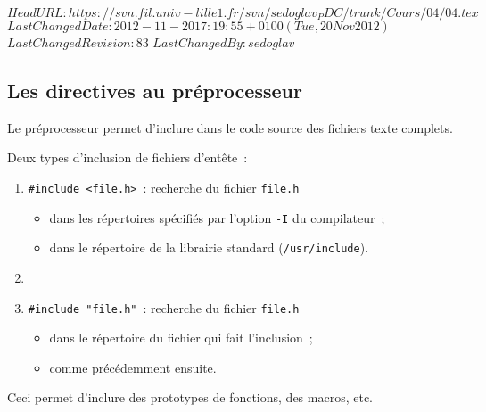 \svnidlong 
{$HeadURL: https://svn.fil.univ-lille1.fr/svn/sedoglav_PDC/trunk/Cours/04/04.tex $} 
{$LastChangedDate: 2012-11-20 17:19:55 +0100 (Tue, 20 Nov 2012) $} 
{$LastChangedRevision: 83 $} 
{$LastChangedBy: sedoglav $} 
\begin{frame}[fragile]
  \section{Les directives au pr\'eprocesseur}%
  Le pr\'eprocesseur permet d'inclure dans le code source des fichiers
  texte complets.
  \par\medskip
  Deux types d'inclusion de fichiers d'ent\^ete~:
  \begin{enumerate}
  \item \verb?#include <file.h>?~: recherche du fichier {\tt file.h}
    \begin{itemize}
    \item dans les r\'epertoires sp\'ecifi\'es par l'option {\tt -I}
      du compilateur~;
    \item dans le r\'epertoire de la librairie standard ({\tt /usr/include}).
    \end{itemize}
  \item[]
  \item {\tt \#include "file.h"}~: recherche du fichier {\tt file.h}
    \begin{itemize}
    \item dans le r\'epertoire du fichier qui fait l'inclusion~;
    \item comme pr\'ec\'edemment ensuite.
    \end{itemize}
  \end{enumerate}
  Ceci permet d'inclure des prototypes de fonctions, des macros, etc.
\end{frame}
